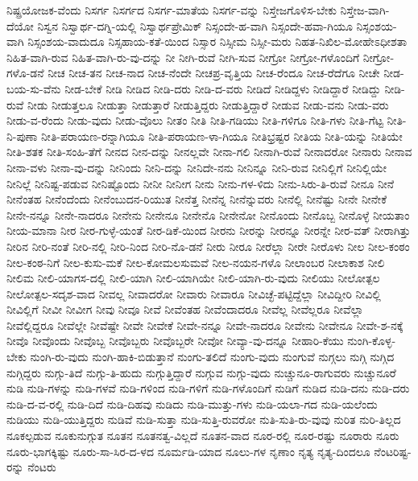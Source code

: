 {ನಿಷ್ಪ್ರಯೋಜಕ-ವೆಂದು
ನಿಸರ್ಗ
ನಿಸರ್ಗದ
ನಿಸರ್ಗ-ಮಾತೆಯ
ನಿಸರ್ಗ-ವನ್ನು
ನಿಸ್ತೇಜಗೊಳಿಸ-ಬೇಕು
ನಿಸ್ತೇಜ-ವಾಗಿ-ದೆಯೋ
ನಿಸ್ವನ
ನಿಸ್ವಾರ್ಥ-ದಗ್ನಿ-ಯಲ್ಲಿ
ನಿಸ್ವಾರ್ಥಪ್ರೇಮಿಕ್
ನಿಸ್ಸಂದೇ-ಹ-ವಾಗಿ
ನಿಸ್ಸಂದೇ-ಹವಾ-ಗಿಯೂ
ನಿಸ್ಸಂಶಯ-ವಾಗಿ
ನಿಸ್ಸಂಶಯ-ವಾದುದೂ
ನಿಸ್ಸಹಾಯ-ಕತೆ-ಯಿಂದ
ನಿಸ್ಸಾರ
ನಿಸ್ಸೀಮ
ನಿಸ್ಸೀ-ಮರು
ನಿಹತ-ನಿಖಿಲ-ಮೋಹೇಽಧೀಶತಾ
ನಿಹಿತ-ವಾಗಿ-ರುವ
ನಿಹಿತ-ವಾಗಿ-ರು-ವು-ದನ್ನು
ನೀ
ನೀಗಿ-ರುವೆ
ನೀಗಿ-ಸುವ
ನೀಗ್ರೋ
ನೀಗ್ರೋ-ಗಳೊಂದಿಗೆ
ನೀಗ್ರೋ-ಗಳೊ-ಡನೆ
ನೀಚ
ನೀಚ-ತನ
ನೀಚ-ನಾದ
ನೀಚ-ನೆಂದೇ
ನೀಚಪ್ರ-ವೃತ್ತಿಯ
ನೀಚ-ರೆಂದೂ
ನೀಚ-ರೆದೆಗೂ
ನೀಚೇ
ನೀಡ-ಬಯ-ಸು-ವೆನು
ನೀಡ-ಬೇಕೆ
ನೀಡಿ
ನೀಡಿದ
ನೀಡಿ-ದರು
ನೀಡಿ-ದ-ವರು
ನೀಡಿದೆ
ನೀಡಿದ್ದಳು
ನೀಡಿದ್ದಾರೆ
ನೀಡಿದ್ದು
ನೀಡಿ-ರುವೆ
ನೀಡು
ನೀಡುತ್ತಲೂ
ನೀಡುತ್ತಾ
ನೀಡುತ್ತಾರೆ
ನೀಡುತ್ತಿದ್ದರು
ನೀಡುತ್ತಿದ್ದಾರೆ
ನೀಡುವ
ನೀಡು-ವನು
ನೀಡು-ವರು
ನೀಡು-ವ-ರೆಂದು
ನೀಡು-ವುದು
ನೀಡು-ವೊಲು
ನೀತಂ
ನೀತಿ
ನೀತಿ-ಗಡಿಯು
ನೀತಿ-ಗಳಿಗೂ
ನೀತಿ-ಗಳು
ನೀತಿ-ಗೆಟ್ಟ
ನೀತಿ-ನಿ-ಪುಣಾ
ನೀತಿ-ಪರಾಯಣ-ರನ್ನಾಗಿಯೂ
ನೀತಿ-ಪರಾಯಣ-ಳಾ-ಗಿಯೂ
ನೀತಿಭ್ರಷ್ಟರ
ನೀತಿಯ
ನೀತಿ-ಯನ್ನು
ನೀತಿಯೇ
ನೀತಿ-ಶತಕ
ನೀತಿ-ಸಂಹಿ-ತೆಗೆ
ನೀನದ
ನೀನ-ದನ್ನು
ನೀನಲ್ಲವೇ
ನೀನಾ-ಗಲಿ
ನೀನಾಗಿ-ರುವೆ
ನೀನಾದರೋ
ನೀನಾರು
ನೀನಾವ
ನೀನಾ-ವಳು
ನೀನಾ-ವು-ದನ್ನು
ನೀನಿಂದು
ನೀನಿ-ದನ್ನು
ನೀನಿದೇ-ನನು
ನೀನಿನ್ನೂ
ನೀನಿ-ರುವ
ನೀನಿಲ್ಲಿಗೆ
ನೀನಿಲ್ಲಿಯೇ
ನೀನಿಲ್ಲೆ
ನೀನಿಷ್ಟ-ಪಡುವ
ನೀನಿಷ್ಟೊಂದು
ನೀನೀ
ನೀನೀಗ
ನೀನು
ನೀನು-ಗಳ-ಳಿದು
ನೀನು-ಸಿರು-ತಿ-ರುವೆ
ನೀನೂ
ನೀನೆ
ನೀನೆಂತಹ
ನೀನೆಂದೆಂದು
ನೀನೆಂಬುದನ-ರಿಯುತ
ನೀನೆತ್ತ
ನೀನೆನ್ನ
ನೀನೆನ್ನುವರು
ನೀನೆಲ್ಲಿ
ನೀನೆಷ್ಟು
ನೀನೇ
ನೀನೇಕೆ
ನೀನೇ-ನನ್ನೂ
ನೀನೇ-ನಾದರೂ
ನೀನೇನು
ನೀನೇನೂ
ನೀನೇನೊ
ನೀನೇನೋ
ನೀನೊಂದು
ನೀನೊಬ್ಬ
ನೀನೊಳ್ಳೆ
ನೀಯತಾಂ
ನೀಯ-ಮಾನಾ
ನೀರ
ನೀರ-ಗುಳ್ಳೆ-ಯಂತೆ
ನೀರ-ಡಿಕೆ-ಯಿಂದ
ನೀರನು
ನೀರನ್ನು
ನೀರನ್ನೂ
ನೀರನ್ನೇ
ನೀರ-ವತ್
ನೀರಾಗಿತ್ತು
ನೀರಿನ
ನೀರಿ-ನಂತೆ
ನೀರಿ-ನಲ್ಲಿ
ನೀರಿ-ನಿಂದ
ನೀರಿ-ನೊ-ಡನೆ
ನೀರು
ನೀರೂ
ನೀರೆಲ್ಲಾ
ನೀರೇ
ನೀರೊಳು
ನೀಲ
ನೀಲ-ಕಂಠಂ
ನೀಲ-ಕಂಠ-ನಿಗೆ
ನೀಲ-ಕುಸು-ಮಕೆ
ನೀಲ-ಕೋಮಲಸುಮವೆ
ನೀಲ-ನಯನ-ಗಳೊ
ನೀಲಾಂಬರ
ನೀಲಾಕಾಶ
ನೀಲಿ
ನೀಲಿಮ
ನೀಲಿ-ಯಾಗಸ-ದಲ್ಲಿ
ನೀಲಿ-ಯಾಗಿ
ನೀಲಿ-ಯಾಗಿಯೇ
ನೀಲಿ-ಯಾಗಿ-ರು-ವುದು
ನೀಲಿಯು
ನೀಲೋತ್ಪಲ
ನೀಲೋತ್ಪಲ-ಸದೃಶ-ವಾದ
ನೀವಲ್ಲ
ನೀವಾದರೋ
ನೀವಾರು
ನೀವಾರೂ
ನೀವಿಚ್ಛೆ-ಪಟ್ಟಿದ್ದೆಲ್ಲಾ
ನೀವಿದ್ದೀರಿ
ನೀವಿಲ್ಲಿ
ನೀವಿಲ್ಲಿಗೆ
ನೀವೀ
ನೀವೀಗ
ನೀವು
ನೀವೂ
ನೀವೆ
ನೀವೆಂತಹ
ನೀವೆಂದಾದರೂ
ನೀವೆಲ್ಲ
ನೀವೆಲ್ಲರೂ
ನೀವೆಲ್ಲಾ
ನೀವೆಲ್ಲಿದ್ದರೂ
ನೀವೆಲ್ಲೇ
ನೀವೆಷ್ಟೇ
ನೀವೇ
ನೀವೇಕೆ
ನೀವೇ-ನನ್ನೂ
ನೀವೇ-ನಾದರೂ
ನೀವೇನು
ನೀವೇನೂ
ನೀವೇ-ಶ-ನಕ್ಕೆ
ನೀವೊ
ನೀವೊಂದು
ನೀವೊಬ್ಬ
ನೀವೊಬ್ಬರು
ನೀವೊಬ್ಬರೇ
ನೀವೋ
ನೀವ್ಯಾ-ವು-ದನ್ನೂ
ನೀಹಾರಿ-ಕೆಯು
ನುಂಗಿ-ಕೊಳ್ಳ-ಬೇಕು
ನುಂಗಿ-ರು-ವುದು
ನುಂಗಿ-ಹಾಕಿ-ಬಿಡುತ್ತಾನೆ
ನುಂಗು-ತಲಿದೆ
ನುಂಗು-ವುದು
ನುಂಗುವೆ
ನುಗ್ಗಲು
ನುಗ್ಗಿ
ನುಗ್ಗಿದ
ನುಗ್ಗಿದ್ದರು
ನುಗ್ಗು-ತಿದೆ
ನುಗ್ಗು-ತಿ-ಹುದು
ನುಗ್ಗುತ್ತಿದ್ದಾರೆ
ನುಗ್ಗುವ
ನುಗ್ಗು-ವುದು
ನುಚ್ಚುನೂ-ರಾಗುವರು
ನುಚ್ಚುನೂರೆ
ನುಡಿ
ನುಡಿ-ಗಳನ್ನು
ನುಡಿ-ಗಳವೆ
ನುಡಿ-ಗಳಿಂದ
ನುಡಿ-ಗಳಿಗೆ
ನುಡಿ-ಗಳೊಂದಿಗೆ
ನುಡಿಗೆ
ನುಡಿದ
ನುಡಿ-ದನು
ನುಡಿ-ದರು
ನುಡಿ-ದ-ವ-ರಲ್ಲಿ
ನುಡಿ-ದಿದೆ
ನುಡಿ-ದಿಹವು
ನುಡಿದು
ನುಡಿ-ಮುತ್ತು-ಗಳು
ನುಡಿ-ಯಲಾ-ಗದ
ನುಡಿ-ಯಲೆಂದು
ನುಡಿಯು
ನುಡಿ-ಯುತ್ತಿದ್ದರು
ನುಡಿವೆ
ನುಡಿ-ಸುತ್ತಾ
ನುಡಿ-ಸುತ್ತಿ-ರುವರೋ
ನುತಿ-ಸುತಿ-ರು-ವುವು
ನುರಿತ
ನುರಿ-ತಿಲ್ಲದ
ನೂಕಲ್ಪಡುವ
ನೂಕುನುಗ್ಗುತ
ನೂತನ
ನೂತನತ್ವ-ವಿಲ್ಲದೆ
ನೂತನ-ವಾದ
ನೂರ-ರಲ್ಲಿ
ನೂರ-ರಷ್ಟು
ನೂರಾರು
ನೂರು
ನೂರು-ಭಾಗಕ್ಕಿಷ್ಟು
ನೂರು-ಸಾ-ಸಿರ-ದ-ಳದ
ನೂರ್ಮಡಿ-ಯಾದ
ನೂಲು-ಗಳ
ನೃಣಾಂ
ನೃತ್ಯ
ನೃತ್ಯ-ದಿಂದಲೂ
ನೆಂಟರಿಷ್ಟ-ರನ್ನು
ನೆಂಟರು
}
